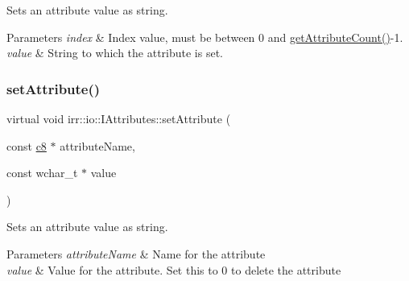 Sets an attribute value as string. 


\begin{DoxyParams}{Parameters}
{\em index} & Index value, must be between 0 and \hyperlink{classirr_1_1io_1_1IAttributes_a796bdd9440ee7ba0b6742a90a82870b6}{get\+Attribute\+Count()}-\/1. \\
\hline
{\em value} & String to which the attribute is set. \\
\hline
\end{DoxyParams}
\mbox{\label{classirr_1_1io_1_1IAttributes_a61d592097529c763c1da1db8ef5af224}} 
\subsubsection{\texorpdfstring{set\+Attribute()}{setAttribute()}\hspace{0.1cm}{\footnotesize\ttfamily [3/5]}}
{\footnotesize\ttfamily virtual void irr\+::io\+::\+I\+Attributes\+::set\+Attribute (\begin{DoxyParamCaption}\item[{const \hyperlink{namespaceirr_a9395eaea339bcb546b319e9c96bf7410}{c8} $\ast$}]{attribute\+Name,  }\item[{const wchar\+\_\+t $\ast$}]{value }\end{DoxyParamCaption})\hspace{0.3cm}{\ttfamily [pure virtual]}}



Sets an attribute value as string. 


\begin{DoxyParams}{Parameters}
{\em attribute\+Name} & Name for the attribute \\
\hline
{\em value} & Value for the attribute. Set this to 0 to delete the attribute \\
\hline
\end{DoxyParams}
\mbox{\label{classirr_1_1io_1_1IAttributes_a679ae0badc391b6814db9cd7cf3d45bc}} 
